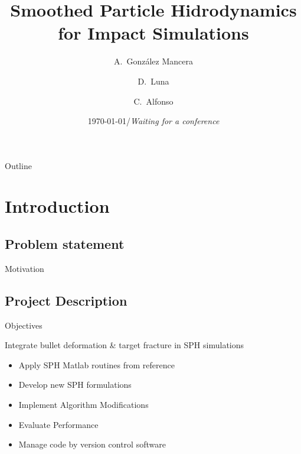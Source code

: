 \documentclass[10pt]{beamer}
\title[Smoothed Particle Hidrodynamics]
{Smoothed Particle Hidrodynamics for Impact Simulations}
\author[A. González-Mancera et al.] %
{A.~González Mancera\inst{1} \and D.~Luna\inst{1} \and C.~Alfonso\inst{1}}
\institute[Universidad de los Andes] %
{
  \inst{1}%
  Department of Mechanical Engineering\\
  Universidad de los Andes
}
\date[APS - DFD 2015] %
{\today/\textit{Waiting for a conference}}
\begin{document}
\begin{frame}
  \titlepage
\end{frame}

 \begin{frame}{Outline}
   \tableofcontents
 \end{frame}




\section{Introduction}

\subsection{Problem statement}


  
\begin{frame}{Motivation}

\end{frame}


\subsection{Project Description}
\begin{frame}{Objectives}
\begin{Large}
\begin{center}
   Integrate bullet deformation \& target fracture in SPH simulations
\end{center}
\end{Large}
   \begin{itemize}
   \item Apply SPH Matlab routines from reference
   \item Develop new SPH formulations
   \item Implement Algorithm Modifications
   \item Evaluate Performance
   \item Manage code by version control software
   \end{itemize}
\end{frame}
\end{document}
